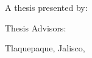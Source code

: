 \begin{titlepage}
\begin{fullwidth}
\begin{center}
        \vspace{1cm}
        
        \Large
        \textcolor{itesodblue}{A thesis presented by: \\
        \textbf{\myauthor}}
        
        \vspace{1cm}
            
        \Large
        \textcolor{itesodblue}{
        Thesis Advisors:\\ 
        \textbf{\myadvisor}
        }
            
        \vspace{1cm}
        
        \vfill
        \large
        \textcolor{itesodblue}{Tlaquepaque, Jalisco, \mydate}
        
    \end{center}
\end{fullwidth}
\end{titlepage}
